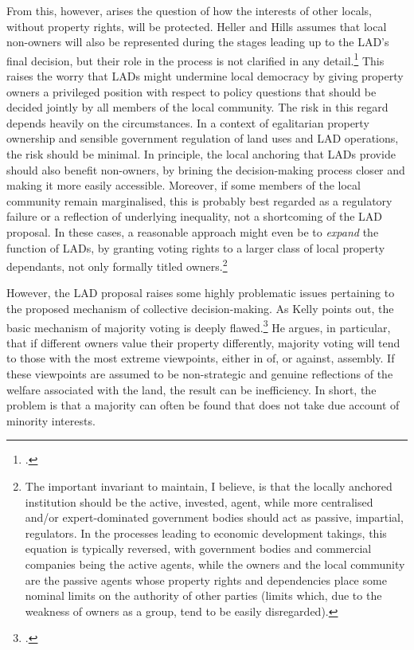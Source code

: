 From this, however, arises the question of how the interests of other locals, without property rights, will be protected. Heller and Hills assumes that local non-owners will also be represented during the stages leading up to the LAD's final decision, but their role in the process is not clarified in any detail.\footcite[1490-1491]{heller08} This raises the worry that LADs might undermine local democracy by giving property owners a privileged position with respect to policy questions that should be decided jointly by all members of the local community. The risk in this regard depends heavily on the circumstances. In a context of egalitarian property ownership and sensible government regulation of land uses and LAD operations, the risk should be minimal. In principle, the local anchoring that LADs provide should also benefit non-owners, by brining the decision-making process closer and making it more easily accessible. Moreover, if some members of the local community remain marginalised, this is probably best regarded as a regulatory failure or a reflection of underlying inequality, not a shortcoming of the LAD proposal. In these cases, a reasonable approach might even be to {\it expand} the function of LADs, by granting voting rights to a larger class of local property dependants, not only formally titled owners.\footnote{The important invariant to maintain, I believe, is that the locally anchored institution should be the active, invested, agent, while more centralised and/or expert-dominated government bodies should act as passive, impartial, regulators. In the processes leading to economic development takings, this equation is typically reversed, with government bodies and commercial companies being the active agents, while the owners and the local community are the passive agents whose property rights and dependencies place some nominal limits on the authority of other parties (limits which, due to the weakness of owners as a group, tend to be easily disregarded).}

However, the LAD proposal raises some highly problematic issues pertaining to the proposed mechanism of collective decision-making. As Kelly points out, the basic mechanism of majority voting is deeply flawed.\footcite{kelly09} He argues, in particular, that if different owners value their property differently, majority voting will tend to  those with the most extreme viewpoints, either in  of, or against, assembly. If these viewpoints are assumed to be non-strategic and genuine reflections of the welfare associated with the land, the result can be inefficiency. In short, the problem is that a majority can often be found that does not take due account of minority interests. 

